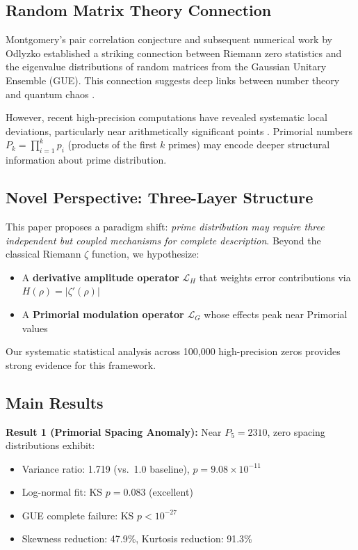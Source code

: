 \documentclass[12pt]{article}
\begin{document}
\subsection{Random Matrix Theory Connection}

Montgomery's pair correlation conjecture \cite{Montgomery1973} and
subsequent numerical work by Odlyzko \cite{Odlyzko1987} established a
striking connection between Riemann zero statistics and the eigenvalue
distributions of random matrices from the Gaussian Unitary Ensemble
(GUE). This connection suggests deep links between number theory and
quantum chaos \cite{Berry1999}.

However, recent high-precision computations have revealed systematic
local deviations, particularly near arithmetically significant points
\cite{Rubinstein1994}. Primorial numbers $P_k = \prod_{i=1}^{k}
p_i$ (products of the first $k$ primes) may encode deeper structural
information about prime distribution.

\subsection{Novel Perspective: Three-Layer Structure}

This paper proposes a paradigm shift: \textit{prime distribution may require three independent but coupled mechanisms for complete description}. Beyond the classical Riemann $\zeta$ function, we hypothesize:

\begin{itemize}
\item A \textbf{derivative amplitude operator} $\mathcal{L}_H$ that weights error contributions via $H(\rho) = |\zeta'(\rho)|$

\item A \textbf{Primorial modulation operator} $\mathcal{L}_G$ whose effects peak near Primorial values
\end{itemize}

Our systematic statistical analysis across 100,000 high-precision zeros provides strong evidence for this framework.

\subsection{Main Results}

\textbf{Result 1 (Primorial Spacing Anomaly):} Near $P_5 = 2310$,
zero spacing distributions exhibit:

\begin{itemize}
\item Variance ratio: 1.719 (vs.\ 1.0 baseline), $p = 9.08 \times 10^{-11}$

\item Log-normal fit: KS $p = 0.083$ (excellent)

\item GUE complete failure: KS $p < 10^{-27}$

\item Skewness reduction: 47.9\%, Kurtosis reduction: 91.3\%
\end{itemize}
\end{document}
